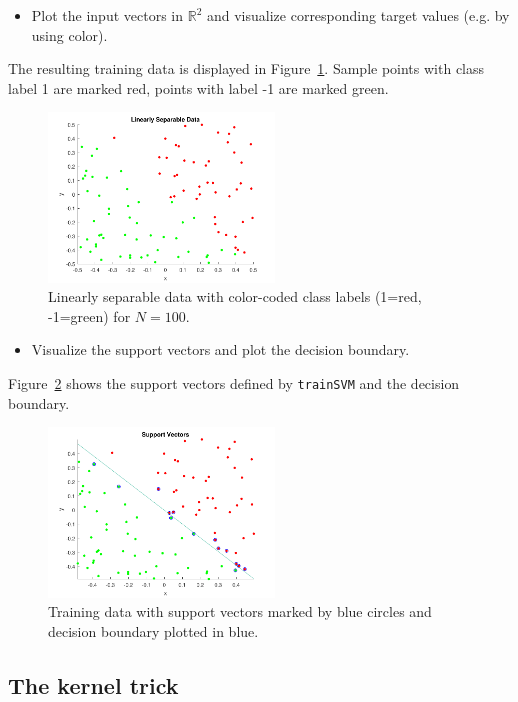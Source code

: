 \documentclass[a4]{article}
\begin{document}
\begin{itemize}
\item Plot the input vectors in $\mathbb{R}^2$ and visualize corresponding target values (e.g. by using color). 
\end{itemize}
The resulting training data is displayed in Figure~\ref{fig:linearData}. Sample points with class label 1 are marked red, points with label -1 are marked green.
\begin{figure}[!h]
	\begin{center}
		\centering
		\includegraphics[width=6cm]{../figures/linearData.pdf}
	\end{center}	
	\caption{Linearly separable data with color-coded class labels (1=red, -1=green) for $N=100$.}
	\label{fig:linearData}
\end{figure}

\begin{itemize}
\item Visualize the support vectors and plot the decision boundary.
\end{itemize}
Figure~\ref{fig:sv} shows the support vectors defined by \texttt{trainSVM} and the decision boundary.
\begin{figure}[!h]
	\begin{center}
		\centering
		\includegraphics[width=6cm]{../figures/sv.pdf}
	\end{center}
	\caption{Training data with support vectors marked by blue circles and decision boundary plotted in blue.}
	\label{fig:sv}
\end{figure}


\subsection{The kernel trick}
\end{document}
